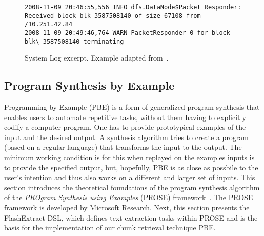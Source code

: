 \begin{figure*}[!t]
  \centering
  \begin{lstlisting}[breaklines=true]
2008-11-09 20:46:55,556 INFO dfs.DataNode$Packet Responder: Received block blk_3587508140 of size 67108 from /10.251.42.84
2008-11-09 20:49:46,764 WARN PacketResponder 0 for block blk\_3587508140 terminating
  \end{lstlisting}  
  \caption{System Log excerpt. Example adapted from~\cite{he2017towards}.}
  \label{lst:system-log}
\end{figure*}

\subsection{Program Synthesis by Example}
\label{sec:rw-prose}

Programming by Example (PBE) is a form of generalized program
synthesis that enables users to automate repetitive tasks, without
them having to explicitly codify a computer program. One has to
provide prototypical examples of the input and the desired output. A
synthesis algorithm tries to create a program (based on a regular
language) that transforms the input to the output. The minimum working
condition is for this when replayed on the examples inputs is to
provide the specified output, but, hopefully, PBE is as close as
possbile to the user's intention and thus also works on a different
and larger set of inputs. This section introduces the theoretical
foundations of the program synthesis algorithm of the \emph{PROgram
Synthesis using Examples} (PROSE) framework~\cite{prose2019webpage}.
The PROSE framework is developed by Microsoft Research. Next, this
section presents the FlashExtract DSL, which defines text extraction
tasks within PROSE and is the basis for the implementation of our
chunk retrieval technique PBE\@.

